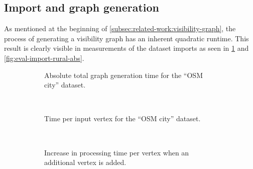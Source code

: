 	\subsection{Import and graph generation}
	
		As mentioned at the beginning of \cref{subsec:related-work:visibility-graph}, the process of generating a visibility graph has an inherent quadratic runtime.
		This result is clearly visible in measurements of the dataset imports as seen in \cref{fig:eval-import-city-abs} and \cref{fig:eval-import-rural-abs}.
		
		\begin{figure}[h]
			\begin{minipage}{.48\textwidth}
				\begin{subfigure}[t]{\linewidth}
					\begin{figcenter}
						
					\end{figcenter}
					\caption{Absolute total graph generation time for the \enquote{OSM city} dataset.}
					\label{fig:eval-import-city-abs}
				\end{subfigure}
				\\[3ex]
				\begin{subfigure}[t]{\linewidth}
					\begin{figcenter}
						
					\end{figcenter}
					\caption{Time per input vertex for the \enquote{OSM city} dataset.}
				\end{subfigure}
				\\[3ex]
				\begin{subfigure}[t]{\linewidth}
					\begin{figcenter}
						
					\end{figcenter}
					\caption{Increase in processing time per vertex when an additional vertex is added.}
					\label{fig:eval-import-city-rel-increase}
				\end{subfigure}
				\caption{Graph generation times using the \enquote{OSM city} dataset.}
				\label{fig:eval-import-city}
			\end{minipage}
			\hfill
			\begin{minipage}{.48\textwidth}
				\begin{subfigure}[t]{\linewidth}
					\begin{figcenter}

\end{figcenter}
\end{subfigure}
\end{minipage}
\end{figure}
